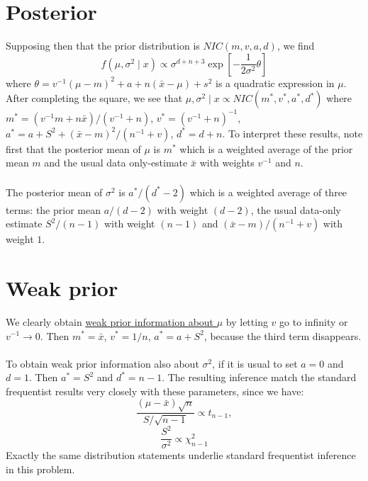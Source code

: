 \documentclass[lecture,12pt,]{pcms-l}
\numberwithin{section}{chapter}
\numberwithin{equation}{chapter}
\theoremstyle{plain}
\theoremstyle{definition}
\theoremstyle{definition}
\begin{document}
\section{Posterior}
Supposing then that  the prior distribution is $NIC(m,v,a,d)$, we find 
\begin{equation}
f(\mu, \sigma^2 \mid x) \propto \sigma^{d+n+3} \exp \left [ -\frac{1}{2 \sigma^2} \theta \right ]
\end{equation}
where $\theta = v^{-1}(\mu - m)^2 +a +n(\bar{x}-\mu)+s^2$ is a quadratic expression in $\mu$. After completing the square, we see that $\mu, \sigma^2 \mid x \propto NIC(m^*,v^*,a^*,d^*)$ where $m^*=(v^{-1}m + n \bar{x})/(v^{-1}+n)$, $v^*= (v^{-1}+n)^{-1}$, $a^* = a+S^2 +( \bar{x}-m)^2/(n^{-1}+v)$, $d^*=d+n$. To interpret these results, note first that the posterior  mean of $\mu$ is $m^*$ which is a weighted average of the prior mean $m$ and the usual data only-estimate $\bar{x}$ with weights $v^{-1}$ and $n$. 
\\
\\
The posterior mean of $\sigma^2$ is $a^* /(d^* -2)$ which is a weighted average of three terms: the prior mean $a/(d-2)$ with weight $(d-2)$, the usual data-only estimate $S^2/(n-1)$ with weight $(n-1)$ and $(\bar{x}-m)/(n^{-1}+v)$ with weight $1$.
\section{Weak prior}
We clearly obtain \underline{weak prior information about $\mu$} by letting $v$ go to infinity or $v^{-1}\rightarrow0$. Then $m^* = \bar{x}$, $v^* = 1/n$, $a^* = a+S^2$, because the third term disappears.
\\
\\
To obtain weak prior information also about $\sigma^2$, if it is usual to set $a=0$ and $d=1$. Then $a^* = S^2$ and $d^* = n-1$. The  resulting inference match the standard frequentist results very closely with these parameters, since we have:
\begin{equation}
\frac{(\mu - \bar{x})\sqrt{n}}{S/\sqrt{n-1}} \propto t_{n-1},
\end{equation}
\begin{equation}
\frac{S^2}{\sigma^2} \propto \chi^{2}_{n-1}
\end{equation}
Exactly the same distribution statements underlie standard frequentist inference in this problem.
\end{document}

